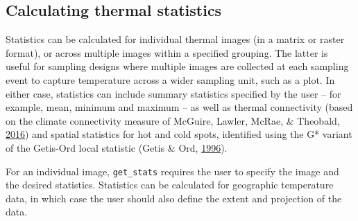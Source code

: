 \documentclass[12pt,british,a4paper,]{article}
\newenvironment{Shaded}{\begin{snugshade}}{\end{snugshade}}
\newcommand{\CommentTok}[1]{\textcolor[rgb]{0.56,0.35,0.01}{\textit{#1}}}
\newcommand{\DataTypeTok}[1]{\textcolor[rgb]{0.13,0.29,0.53}{#1}}
\newcommand{\KeywordTok}[1]{\textcolor[rgb]{0.13,0.29,0.53}{\textbf{#1}}}
\newcommand{\NormalTok}[1]{#1}
\newcommand{\OperatorTok}[1]{\textcolor[rgb]{0.81,0.36,0.00}{\textbf{#1}}}
\newcommand{\OtherTok}[1]{\textcolor[rgb]{0.56,0.35,0.01}{#1}}
\newcommand{\StringTok}[1]{\textcolor[rgb]{0.31,0.60,0.02}{#1}}
\begin{document}
\hypertarget{calculating-thermal-statistics}{%
\subsection{Calculating thermal statistics}\label{calculating-thermal-statistics}}

Statistics can be calculated for individual thermal images (in a matrix or raster format), or across multiple images within a specified grouping. The latter is useful for sampling designs where multiple images are collected at each sampling event to capture temperature across a wider sampling unit, such as a plot. In either case, statistics can include summary statistics specified by the user -- for example, mean, minimum and maximum -- as well as thermal connectivity (based on the climate connectivity measure of McGuire, Lawler, McRae, \& Theobald, \protect\hyperlink{ref-mcguire_achieving_2016}{2016}) and spatial statistics for hot and cold spots, identified using the G* variant of the Getis-Ord local statistic (Getis \& Ord, \protect\hyperlink{ref-getis_local_1996}{1996}).

For an individual image, \texttt{get\_stats} requires the user to specify the image and the desired statistics. Statistics can be calculated for geographic temperature data, in which case the user should also define the extent and projection of the data.

\begin{Shaded}
\end{Shaded}
\end{document}

